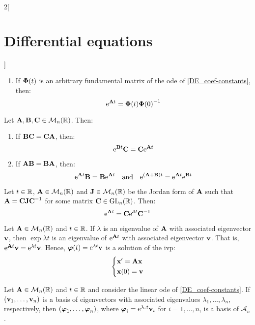 \documentclass[../../../main.tex]{subfiles}
\begin{document}
\begin{multicols}{2}[\section{Differential equations}]
\begin{prop}
\begin{enumerate}
      \item If $\vf{\Phi}(t)$ is an arbitrary fundamental matrix of the ode of \cref{DE_coef-constants}, then: $$\exp{\vf{A}t}=\vf{\Phi}(t){\vf{\Phi}(0)}^{-1}$$
    \end{enumerate}
  \end{prop}
  \begin{lemma}
    Let $\vf{A},\vf{B},\vf{C}\in\mathcal{M}_n(\RR)$. Then:
    \begin{enumerate}
      \item If $\vf{B}\vf{C}=\vf{C}\vf{A}$, then: $$\exp{\vf{B}t}\vf{C}=\vf{C}\exp{\vf{A}t}$$
      \item If $\vf{A}\vf{B}=\vf{B}\vf{A}$, then: $$\exp{\vf{A}t}\vf{B}=\vf{B}\exp{\vf{A}t}\quad\text{and}\quad\exp{(\vf{A}+\vf{B})t}=\exp{\vf{A}t}\exp{\vf{B}t}$$
    \end{enumerate}
  \end{lemma}
  \begin{corollary}
    Let $t\in\RR$, $\vf{A}\in\mathcal{M}_n(\RR)$ and $\vf{J}\in\mathcal{M}_n(\RR)$ be the Jordan form of $\vf{A}$ such that $\vf{A}=\vf{C}\vf{J}\vf{C}^{-1}$ for some matrix $\vf{C}\in\GL_n(\RR)$. Then: $$\exp{\vf{A}t}=\vf{C}\exp{\vf{J}t}\vf{C}^{-1}$$
  \end{corollary}
  \begin{prop}
    Let $\vf{A}\in\mathcal{M}_n(\RR)$ and $t\in\RR$. If $\lambda$ is an eigenvalue of $\vf{A}$ with associated eigenvector $\vf{v}$, then $\exp{\lambda t}$ is an eigenvalue of $\exp{\vf{A}t}$ with associated eigenvector $\vf{v}$. That is, $\exp{\vf{A}t}\vf{v}=\exp{\lambda t}\vf{v}$. Hence, $\vf{\varphi}(t)=\exp{\lambda t}\vf{v}$ is a solution of the ivp:
    $$
      \left\{
      \begin{aligned}
         & \vf{x}'      =\vf{A}\vf{x} \\
         & \vf{x}(0)  =\vf{v}
      \end{aligned}
      \right.
    $$
  \end{prop}
  \begin{corollary}
    Let $\vf{A}\in\mathcal{M}_n(\RR)$ and $t\in\RR$ and consider the linear ode of \cref{DE_coef-constants}. If $(\vf{v}_1,\ldots,\vf{v}_n)$ is a basis of eigenvectors with associated eigenvalues $\lambda_1,\ldots,\lambda_n$, respectively, then $(\vf{\varphi}_1,\ldots,\vf{\varphi}_n)$, where $\vf{\varphi}_i=\exp{\lambda_it}\vf{v}_i$ for $i=1,\ldots,n$, is a basis of $\mathcal{A}_n$.
  \end{corollary}
  \begin{lemma}

\end{lemma}
\end{multicols}
\end{document}
